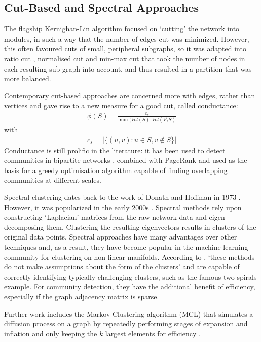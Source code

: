 \documentclass{report}
\begin{document}
	\subsection{Cut-Based and Spectral Approaches}
	The flagship Kernighan-Lin algorithm  \cite{kernighan1970efficient} focused on `cutting' the network into modules, in such a way that the number of edges cut was minimized. 
	However, this often favoured cuts of small, peripheral subgraphs, so it was adapted into ratio cut \cite{wei1991ratio}, normalised cut \cite{shi2000normalized} and min-max cut \cite{ding2001min} that took the number of nodes in each resulting sub-graph into account, and thus resulted in a partition that was more balanced.
	
	Contemporary cut-based approaches are concerned more with edges, rather than vertices and gave rise to a new measure for a good cut, called conductance:
	\begin{align}
	\phi(S) = \frac{c_s}{\min(Vol(S),Vol(V \setminus S)} 
	\end{align}
	with
	\begin{align}
	c_s = |\{(u,v) : u \in S, v \not\in S\}|
	\end{align}
	Conductance is still prolific in the literature: it has been used to detect communities in bipartite networks \cite{barber2007modularity}, combined with PageRank \cite{andersen2006local} and used as the basis for a greedy optimisation algorithm \cite{lancichinetti2009community} capable of finding overlapping communities at different scales. 
	
	Spectral clustering dates back to the work of Donath and Hoffman in 1973 \cite{donath1973lower}. 
	However, it was popularized in the early 2000s \cite{shi2000normalized,ng2002spectral,ding2004tutorial}. 
	Spectral methods rely upon constructing `Laplacian' matrices from the raw network data and eigen-decomposing them. 
	Clustering the resulting eigenvectors results in clusters of the original data points. 
	Spectral approaches have many advantages over other techniques and, as a result, they have become popular in the machine learning community for clustering  on non-linear manifolds. 
	According to \cite{von2007tutorial}, `these methods do not make assumptions about the form of the clusters' and are capable of correctly identifying typically challenging clusters, such as the famous two spirals example. 
	For community detection, they have the additional benefit of efficiency, especially if the graph adjacency matrix is sparse. 

	Further work includes the Markov Clustering algorithm (MCL) that simulates a diffusion process on a graph by repeatedly performing stages of expansion and inflation and only keeping the $k$ largest elements for efficiency \cite{van2001graph}. 
	
\end{document}
